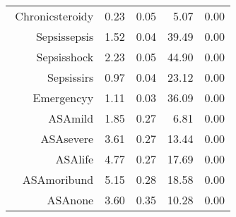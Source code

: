 \begin{tabular}{rrrrr}
$$  Chronic\-steroid\-y & 0.23 & 0.05 & 5.07 & 0.00 \\ 
  Sepsis\-sepsis & 1.52 & 0.04 & 39.49 & 0.00 \\ 
  Sepsis\-shock & 2.23 & 0.05 & 44.90 & 0.00 \\ 
  Sepsis\-sirs & 0.97 & 0.04 & 23.12 & 0.00 \\ 
  Emergency\-y & 1.11 & 0.03 & 36.09 & 0.00 \\ 
  ASA\-mild & 1.85 & 0.27 & 6.81 & 0.00 \\ 
  ASA\-severe & 3.61 & 0.27 & 13.44 & 0.00 \\ 
  ASA\-life & 4.77 & 0.27 & 17.69 & 0.00 \\ 
  ASA\-moribund & 5.15 & 0.28 & 18.58 & 0.00 \\ 
  ASA\-none & 3.60 & 0.35 & 10.28 & 0.00 \\ 
   \hline
\end{tabular}


